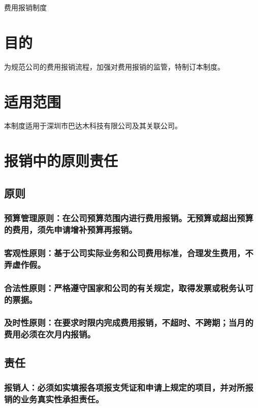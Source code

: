 \documentclass[16pt]{article}
\begin{document}
\begin{center}
\Large 费用报销制度
\end{center}
\vspace{3ex}
\section{目的}
为规范公司的费用报销流程，加强对费用报销的监管，特制订本制度。
\nopagebreak
\section{适用范围}
本制度适用于深圳市巴达木科技有限公司及其关联公司。
\nopagebreak
\section{报销中的原则责任}
\subsection{原则}
\subsubsection{预算管理原则：在公司预算范围内进行费用报销。无预算或超出预算的费用，须先申请增补预算再报销。}
\subsubsection{客观性原则：基于公司实际业务和公司费用标准，合理发生费用，不弄虚作假。}
\subsubsection{合法性原则：严格遵守国家和公司的有关规定，取得发票或税务认可的票据。}
\subsubsection{及时性原则：在要求时限内完成费用报销，不超时、不跨期；当月的费用必须在次月内报销。}
\subsection{责任}
\subsubsection{报销人：必须如实填报各项报支凭证和申请上规定的项目，并对所报销的业务真实性承担责任。}
\end{document}
